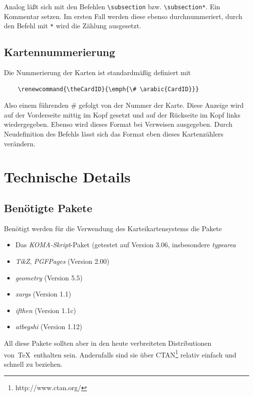 \documentclass[a4paper,DIV=calc]{scrartcl}
\newcommand{\befehl}[1]{%
\marginpar{\footnotesize\textsf{#1}}%
}
\begin{document}
Analog läßt sich mit den Befehlen \lstinline!\subsection! bzw. \lstinline!\subsection*!. Ein Kommentar setzen. Im ersten Fall werden diese ebenso durchnummeriert, durch den Befehl mit \lstinline!*! wird die Zählung ausgesetzt.

\subsection{Kartennummerierung}
Die Nummerierung der Karten ist standardmäßig definiert mit \befehl{\textbackslash theCardID}
\begin{lstlisting}
	\renewcommand{\theCardID}{\emph{\# \arabic{CardID}}}
\end{lstlisting}
Also einem führenden \# gefolgt von der Nummer der Karte. Diese Anzeige wird auf der Vorderseite mittig im Kopf gesetzt und auf der Rückseite im Kopf links wiedergegeben. Ebenso wird dieses Format bei Verweisen ausgegeben. Durch Neudefinition des Befehls lässt sich das Format eben dieses Kartenzählers verändern.
%
%
%
\section{Technische Details}
\subsection{Benötigte Pakete}
Benötigt werden für die Verwendung des Karteikartensystems die Pakete
\begin{itemize}
	\item Das \emph{KOMA-Skript}-Paket (getestet auf Version 3.06, insbesondere \emph{typearea}
	\item \emph{TikZ}, \emph{PGFPages} (Version 2.00)
	\item \emph{geometry} (Version 5.5)
	\item \emph{xargs} (Version 1.1)
	\item \emph{ifthen} (Version 1.1c)
	\item \emph{atbegshi} (Version 1.12)
\end{itemize}
All diese Pakete sollten aber in den heute verbreiteten Distributionen von\ \TeX\ enthalten sein. Andernfalls sind sie über CTAN\footnote{http://www.ctan.org/} relativ einfach und schnell zu beziehen.
\end{document}
